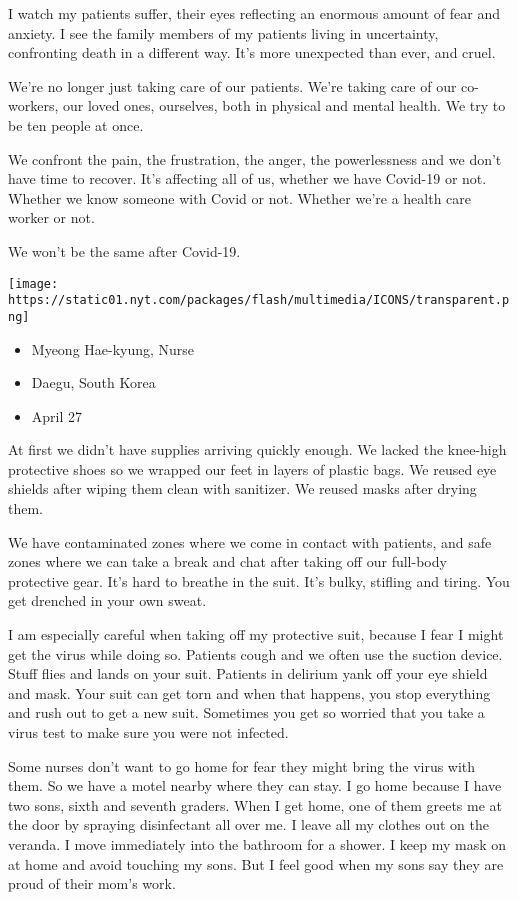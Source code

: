 I watch my patients suffer, their eyes reflecting an enormous amount of
fear and anxiety. I see the family members of my patients living in
uncertainty, confronting death in a different way. It's more unexpected
than ever, and cruel.

We're no longer just taking care of our patients. We're taking care of
our co-workers, our loved ones, ourselves, both in physical and mental
health. We try to be ten people at once.

We confront the pain, the frustration, the anger, the powerlessness and
we don't have time to recover. It's affecting all of us, whether we have
Covid-19 or not. Whether we know someone with Covid or not. Whether
we're a health care worker or not.

We won't be the same after Covid-19.

\texttt{[image: https://static01.nyt.com/packages/flash/multimedia/ICONS/transparent.png]}

\begin{itemize}
\tightlist
\item
  Myeong Hae-kyung, Nurse
\item
  Daegu, South Korea
\item
  April 27
\end{itemize}

At first we didn't have supplies arriving quickly enough. We lacked the
knee-high protective shoes so we wrapped our feet in layers of plastic
bags. We reused eye shields after wiping them clean with sanitizer. We
reused masks after drying them.

We have contaminated zones where we come in contact with patients, and
safe zones where we can take a break and chat after taking off our
full-body protective gear. It's hard to breathe in the suit. It's bulky,
stifling and tiring. You get drenched in your own sweat.

I am especially careful when taking off my protective suit, because I
fear I might get the virus while doing so. Patients cough and we often
use the suction device. Stuff flies and lands on your suit. Patients in
delirium yank off your eye shield and mask. Your suit can get torn and
when that happens, you stop everything and rush out to get a new suit.
Sometimes you get so worried that you take a virus test to make sure you
were not infected.

Some nurses don't want to go home for fear they might bring the virus
with them. So we have a motel nearby where they can stay. I go home
because I have two sons, sixth and seventh graders. When I get home, one
of them greets me at the door by spraying disinfectant all over me. I
leave all my clothes out on the veranda. I move immediately into the
bathroom for a shower. I keep my mask on at home and avoid touching my
sons. But I feel good when my sons say they are proud of their mom's
work.

